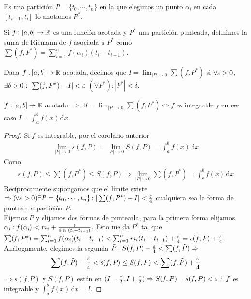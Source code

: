 \begin{definition}
  Es una partición $P = \{t_0, \cdots, t_n\}$ en la que elegimos un punto $\alpha_i$ en cada $[t_{i-1}, t_i]$ lo anotamos $P^*$.
\end{definition}

\begin{definition}
  Si $f: [a,b] \to \mathbb{R}$ es una función acotada y $P^*$ una partición punteada, definimos la suma de Riemann de $f$ asociada a $P^*$ como $\sum (f, P^*) = \sum_{i = 1}^n f(\alpha_i) (t_i - t_{i-1})$.
\end{definition}

\begin{definition}
  Dada $f: [a, b] \to \mathbb{R}$ acotada, decimos que $I = \lim_{|P| \to 0} \sum (f, P^*)$ si $\forall \varepsilon > 0$, $\exists \delta > 0 : | \sum (f, P^*) - I| < \varepsilon$ $(\forall P^*) : |P^*| < \delta$.
\end{definition}

\begin{theorem}
  $f: [a, b] \to \mathbb{R}$ acotada $\Rightarrow \exists I = \lim_{|P| \to 0} \sum (f, P^*) \iff f$ es integrable y en ese caso $I = \int_a^b f(x) \, \mathrm{d}x$.
  \begin{proof}
    Si $f$ es integrable, por el corolario anterior \begin{align*}
      \lim_{|P| \to 0} s(f, P) = \lim_{|P| \to 0} S(f, P) = \int_a^b f(x) \, \mathrm{d}x
    \end{align*}
    Como \begin{align*}s(f, P) \leq \sum(f, P^*) \leq S(f, P) \Rightarrow \lim_{|P| \to 0} \sum(f, P^*) = \int_a^b f(x) \, \mathrm{d}x \end{align*}
    Recíprocamente supongamos que el límite existe $\Rightarrow (\forall \varepsilon > 0) \exists P = \{ t_0, \cdots, t_n \} : |\sum (f, P^*) - I| < \frac{\varepsilon}{4}$ cualquiera sea la forma de puntear la partición $P$. \\
    Fijemos $P$ y elijamos dos formas de puntearla, para la primera forma elijamos $\alpha_i : f(\alpha_i) < m_i + \frac{\varepsilon}{4 \cdot n \cdot (t_i - t_{i-1})}$. Esto me da $P^*$ tal que $\sum (f, P^*) = \sum_{i = 1}^n f(\alpha_i) (t_i - t_{i-1}) < \sum_{i = 1}^n m_i (t_i - t_{i-1}) + \frac{\varepsilon}{4} = s(f, P) + \frac{\varepsilon}{4}$. \\
    Análogamente, elegimos la segunda $\tilde{P} : S(f, P) - \frac{\varepsilon}{4} < \sum (f, \tilde{P}) \Rightarrow$
    \begin{align*}
      \sum (f, \tilde{P}) - \frac{\varepsilon}{4} < s(f, P) \leq S(f, P) < \sum (f, \tilde{P}) + \frac{\varepsilon}{4}
    \end{align*}
    $\Rightarrow s(f, P)$ y $S(f, P)$ están en $(I - \frac{\varepsilon}{2}, I + \frac{\varepsilon}{2}) \Rightarrow S(f, P)- s(f, P) < \varepsilon \therefore f$ es integrable y $\int_a^b f(x) \, \mathrm{d}x = I$.
  \end{proof}
\end{theorem}

